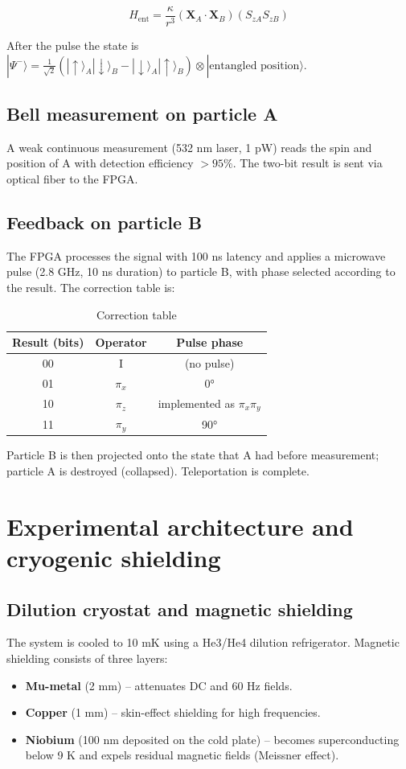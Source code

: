 \documentclass[12pt,a4paper]{article}
\begin{document}
\begin{equation}
H_{\text{ent}} = \frac{\kappa}{r^3} (\mathbf{X}_A\cdot\mathbf{X}_B)(S_{zA}S_{zB})
\end{equation}

After the pulse the state is $|\Psi^-\rangle = \frac{1}{\sqrt{2}}(|\uparrow\rangle_A|\downarrow\rangle_B - |\downarrow\rangle_A|\uparrow\rangle_B) \otimes |\text{entangled position}\rangle$.

\subsection{Bell measurement on particle A}
A weak continuous measurement (532 nm laser, 1 pW) reads the spin and position of A with detection efficiency $>95\%$. The two-bit result is sent via optical fiber to the FPGA.

\subsection{Feedback on particle B}
The FPGA processes the signal with 100 ns latency and applies a microwave pulse (2.8 GHz, 10 ns duration) to particle B, with phase selected according to the result. The correction table is:

\begin{table}[h]
\centering
\caption{Correction table}
\begin{tabular}{|c|c|c|}
\hline
Result (bits) & Operator & Pulse phase \\
\hline
00 & I & (no pulse) \\
01 & $\pi_x$ & 0° \\
10 & $\pi_z$ & implemented as $\pi_x\pi_y$ \\
11 & $\pi_y$ & 90° \\
\hline
\end{tabular}
\end{table}

Particle B is then projected onto the state that A had before measurement; particle A is destroyed (collapsed). Teleportation is complete.

\section{Experimental architecture and cryogenic shielding}

\subsection{Dilution cryostat and magnetic shielding}
The system is cooled to 10 mK using a He3/He4 dilution refrigerator. Magnetic shielding consists of three layers:
\begin{itemize}
\item \textbf{Mu-metal} (2 mm) – attenuates DC and 60 Hz fields.
\item \textbf{Copper} (1 mm) – skin-effect shielding for high frequencies.
\item \textbf{Niobium} (100 nm deposited on the cold plate) – becomes superconducting below 9 K and expels residual magnetic fields (Meissner effect).
\end{itemize}
\end{document}
